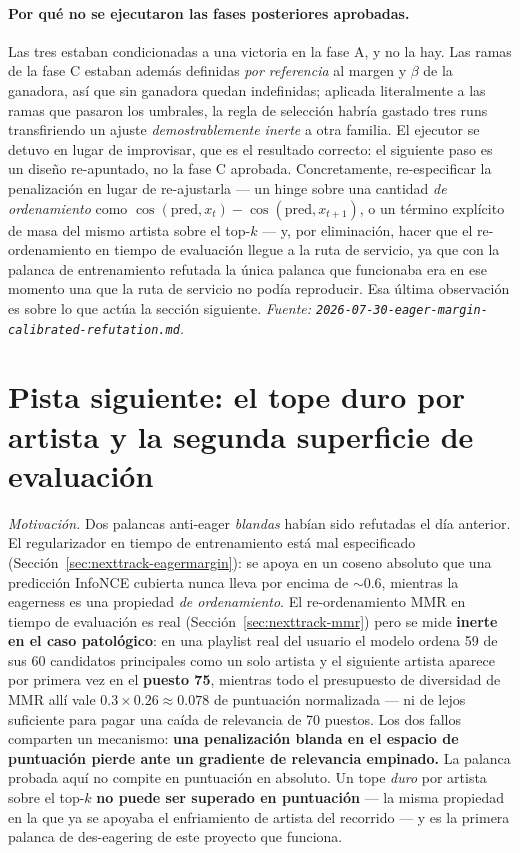 \documentclass[11pt]{article}
\begin{document}
\paragraph{Por qué no se ejecutaron las fases posteriores aprobadas.} Las tres
estaban condicionadas a una victoria en la fase A, y no la hay. Las ramas de la fase
C estaban además definidas \emph{por referencia} al margen y $\beta$ de la
ganadora, así que sin ganadora quedan indefinidas; aplicada literalmente a las ramas
que pasaron los umbrales, la regla de selección habría gastado tres runs
transfiriendo un ajuste \emph{demostrablemente inerte} a otra familia. El ejecutor
se detuvo en lugar de improvisar, que es el resultado correcto: el siguiente paso es
un diseño re-apuntado, no la fase C aprobada. Concretamente, re-especificar la
penalización en lugar de re-ajustarla --- un hinge sobre una cantidad \emph{de
ordenamiento} como $\cos(\mathrm{pred}, x_t) - \cos(\mathrm{pred}, x_{t+1})$, o un
término explícito de masa del mismo artista sobre el top-$k$ --- y, por eliminación,
hacer que el re-ordenamiento en tiempo de evaluación llegue a la ruta de servicio,
ya que con la palanca de entrenamiento refutada la única palanca que funcionaba era
en ese momento una que la ruta de servicio no podía reproducir. Esa última
observación es sobre lo que actúa la sección siguiente.
\emph{Fuente: \texttt{2026-07-30-eager-margin-calibrated-refutation.md}.}

\section{Pista siguiente: el tope duro por artista y la segunda superficie de evaluación}
\label{sec:nexttrack-artistcap}
\emph{Motivación.} Dos palancas anti-eager \emph{blandas} habían sido refutadas el
día anterior. El regularizador en tiempo de entrenamiento está mal especificado
(Sección~\ref{sec:nexttrack-eagermargin}): se apoya en un coseno absoluto que una
predicción InfoNCE cubierta nunca lleva por encima de ${\sim}\num{0.6}$, mientras
la eagerness es una propiedad \emph{de ordenamiento}. El re-ordenamiento MMR en
tiempo de evaluación es real (Sección~\ref{sec:nexttrack-mmr}) pero se mide
\textbf{inerte en el caso patológico}: en una playlist real del usuario el modelo
ordena \num{59} de sus \num{60} candidatos principales como un solo artista y el
siguiente artista aparece por primera vez en el \textbf{puesto \num{75}}, mientras
todo el presupuesto de diversidad de MMR allí vale
$\num{0.3}\times\num{0.26}\approx\num{0.078}$ de puntuación normalizada --- ni de
lejos suficiente para pagar una caída de relevancia de 70 puestos. Los dos fallos
comparten un mecanismo: \textbf{una penalización blanda en el espacio de puntuación
pierde ante un gradiente de relevancia empinado.} La palanca probada aquí no compite
en puntuación en absoluto. Un tope \emph{duro} por artista sobre el top-$k$
\textbf{no puede ser superado en puntuación} --- la misma propiedad en la que ya se
apoyaba el enfriamiento de artista del recorrido --- y es la primera palanca de
des-eagering de este proyecto que funciona.
\end{document}
